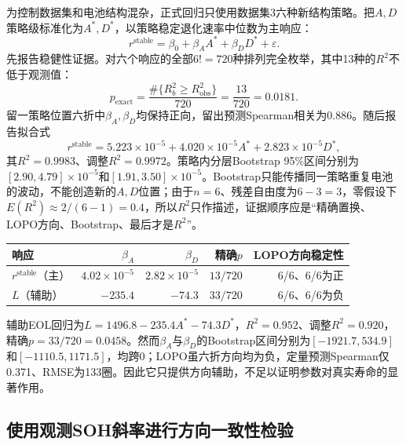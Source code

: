 \documentclass[withoutpreface]{cumcmthesis}
\begin{document}
为控制数据集和电池结构混杂，正式回归只使用数据集3六种新结构策略。把$A,D$策略级标准化为$A^*,D^*$，以策略稳定退化速率中位数为主响应：
\begin{equation}
r^{\mathrm{stable}}=\beta_0+\beta_A A^*+\beta_DD^*+\varepsilon.
\end{equation}
先报告稳健性证据。对六个响应的全部$6!=720$种排列完全枚举，其中13种的$R^2$不低于观测值：
\begin{equation}
p_{\mathrm{exact}}
=\frac{\#\{R_b^2\ge R_{\mathrm{obs}}^2\}}{720}
=\frac{13}{720}=0.0181.
\end{equation}
留一策略位置六折中$\beta_A,\beta_D$均保持正向，留出预测Spearman相关为0.886。随后报告拟合式
\begin{equation}
\boxed{r^{\mathrm{stable}}
=5.223\times10^{-5}
+4.020\times10^{-5}A^*
+2.823\times10^{-5}D^*},
\end{equation}
其$R^2=0.9983$、调整$R^2=0.9972$。策略内分层Bootstrap 95\%区间分别为$[2.90,4.79]\times10^{-5}$和$[1.91,3.50]\times10^{-5}$。Bootstrap只能传播同一策略重复电池的波动，不能创造新的$A,D$位置；由于$n=6$、残差自由度为$6-3=3$，零假设下$E(R^2)\approx2/(6-1)=0.4$，所以$R^2$只作描述，证据顺序应是“精确置换、LOPO方向、Bootstrap、最后才是$R^2$”。

\begin{table}[H]
\centering
{}
\begin{tabular}{lrrrr}
\toprule
\rowcolor{TableHeader}
响应 & $\beta_A$ & $\beta_D$ & 精确$p$ & LOPO方向稳定性 \\
\midrule
$r^{\mathrm{stable}}$（主） & $4.02\times10^{-5}$ & $2.82\times10^{-5}$ & $13/720$ & 6/6、6/6为正 \\
$L$（辅助） & $-235.4$ & $-74.3$ & $33/720$ & 6/6、6/6为负 \\
\bottomrule
\end{tabular}
\label{tab:q2reg}
\end{table}

辅助EOL回归为$L=1496.8-235.4A^*-74.3D^*$，$R^2=0.952$、调整$R^2=0.920$，精确$p=33/720=0.0458$。然而$\beta_A$与$\beta_D$的Bootstrap区间分别为$[-1921.7,534.9]$和$[-1110.5,1171.5]$，均跨0；LOPO虽六折方向均为负，定量预测Spearman仅0.371、RMSE为133圈。因此它只提供方向辅助，不足以证明参数对真实寿命的显著作用。

\subsection{使用观测SOH斜率进行方向一致性检验}
\end{document}
